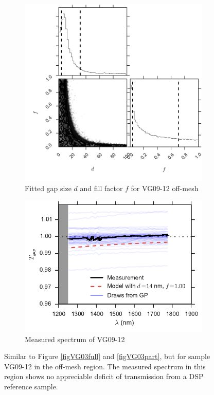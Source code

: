 \documentclass[osajnl,preprint,showpacs,superscriptaddress,12pt]{revtex4-1} %
\begin{document}
\begin{figure}[htbp]
    \centering
    \begin{subfigure}[b]{0.5\textwidth}
        \includegraphics[width=\textwidth]{figs/VG0912_0gap_corner.pdf}
        \caption{Fitted gap size $d$ and fill factor $f$ for VG09-12 off-mesh}
	\label{VG0912_0gap_corner}
    \end{subfigure}
    \begin{subfigure}[b]{0.5\textwidth}
        \includegraphics[width=\textwidth]{figs/VG0912_0gap.pdf}
        \caption{Measured spectrum of VG09-12}
        \label{VG0912_0gap}
    \end{subfigure}
\caption{Similar to Figure \ref{figVG03full} and \ref{figVG03part}, but for sample VG09-12 in the off-mesh region.  The measured spectrum in this region shows no appreciable deficit of transmission from a DSP reference sample.
\label{figVG12}}
\end{figure}
\end{document}
